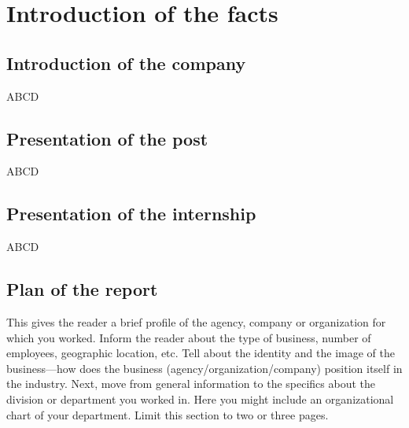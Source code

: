 \chapter{Introduction of the facts}
\section{Introduction of the company}
ABCD
\section{Presentation of the post}
ABCD
\section{Presentation of the internship}
ABCD
\section{Plan of the report}
This gives the reader a brief profile of the agency, company or organization for which you worked. Inform the reader about the type of business, number of employees, geographic location, etc. Tell about the identity and the image of the business—how does the business (agency/organization/company) position itself in the industry. Next, move from general information to the specifics about the division or department you worked in. Here you might include an organizational chart of your department. Limit this section to two or three pages.
\cite{Ruel_2012}
